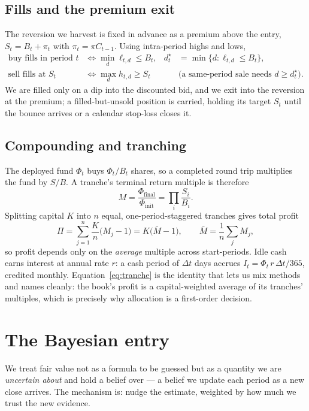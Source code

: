 \documentclass[11pt]{article}
\begin{document}
\subsection{Fills and the premium exit}
The reversion we harvest is fixed in advance as a premium above the entry, $S_t=B_t+\pi_t$ with
$\pi_t=\pi C_{t-1}$. Using intra-period highs and lows,
\begin{align}
\text{buy fills in period }t &\iff \min_d \ell_{t,d}\le B_t,
  & d_t^{\star}&=\min\{d:\ell_{t,d}\le B_t\},\\
\text{sell fills at }S_t &\iff \max_d h_{t,d}\ge S_t
  &&\text{(a same-period sale needs } d\ge d_t^{\star}).
\end{align}
We are filled only on a dip into the discounted bid, and we exit into the reversion at the
premium; a filled-but-unsold position is carried, holding its target $S_t$ until the bounce
arrives or a calendar stop-loss closes it.

\subsection{Compounding and tranching}
The deployed fund $\Phi_t$ buys $\Phi_t/B_t$ shares, so a completed round trip multiplies the
fund by $S/B$. A tranche's terminal return multiple is therefore
\begin{equation}
M=\frac{\Phi_{\text{final}}}{\Phi_{\text{init}}}=\prod_i \frac{S_i}{B_i}.
\end{equation}
Splitting capital $K$ into $n$ equal, one-period-staggered tranches gives total profit
\begin{equation}\label{eq:tranche}
\Pi=\sum_{j=1}^{n}\frac{K}{n}\bigl(M_j-1\bigr)=K\bigl(\bar M-1\bigr),
\qquad \bar M=\frac1n\sum_j M_j,
\end{equation}
so profit depends only on the \emph{average} multiple across start-periods. Idle cash earns
interest at annual rate $r$: a cash period of $\Delta t$ days accrues
$I_t=\Phi_t\,r\,\Delta t/365$, credited monthly. Equation~\eqref{eq:tranche} is the identity that
lets us mix methods and names cleanly: the book's profit is a capital-weighted average of its
tranches' multiples, which is precisely why allocation is a first-order decision.

\section{The Bayesian entry}

We treat fair value not as a formula to be guessed but as a quantity we are \emph{uncertain
about} and hold a belief over --- a belief we update each period as a new close arrives. The
mechanism is: nudge the estimate, weighted by how much we trust the new evidence.
\end{document}
